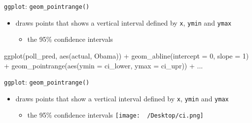 \documentclass[
  ignorenonframetext,
]{beamer}
\newenvironment{Shaded}{\begin{snugshade}}{\end{snugshade}}
\newcommand{\AttributeTok}[1]{\textcolor[rgb]{0.40,0.45,0.13}{#1}}
\newcommand{\DecValTok}[1]{\textcolor[rgb]{0.68,0.00,0.00}{#1}}
\newcommand{\FunctionTok}[1]{\textcolor[rgb]{0.28,0.35,0.67}{#1}}
\newcommand{\NormalTok}[1]{\textcolor[rgb]{0.00,0.23,0.31}{#1}}
\newcommand{\SpecialCharTok}[1]{\textcolor[rgb]{0.37,0.37,0.37}{#1}}
\providecommand{\tightlist}{%
  \setlength{\itemsep}{0pt}\setlength{\parskip}{0pt}}\usepackage{longtable,booktabs,array}
\begin{document}
\begin{frame}[fragile]{\texttt{ggplot}: \texttt{geom\_pointrange()}}
\protect\hypertarget{ggplot-geom_pointrange}{}
\begin{itemize}
\tightlist
\item
  draws points that shows a vertical interval defined by \texttt{x},
  \texttt{ymin} and \texttt{ymax}

  \begin{itemize}
  \tightlist
  \item
    the 95\% confidence intervals
  \end{itemize}
\end{itemize}

\begin{Shaded}
\begin{Highlighting}[]
\FunctionTok{ggplot}\NormalTok{(poll\_pred, }\FunctionTok{aes}\NormalTok{(actual, Obama)) }\SpecialCharTok{+}
  \FunctionTok{geom\_abline}\NormalTok{(}\AttributeTok{intercept =} \DecValTok{0}\NormalTok{,}
              \AttributeTok{slope =} \DecValTok{1}\NormalTok{) }\SpecialCharTok{+}
  \FunctionTok{geom\_pointrange}\NormalTok{(}\FunctionTok{aes}\NormalTok{(}\AttributeTok{ymin =}\NormalTok{ ci\_lower,}
                      \AttributeTok{ymax =}\NormalTok{ ci\_upr)) }\SpecialCharTok{+}
\NormalTok{  ...}
\end{Highlighting}
\end{Shaded}
\end{frame}

\begin{frame}[fragile]{\texttt{ggplot}: \texttt{geom\_pointrange()}}
\protect\hypertarget{ggplot-geom_pointrange-1}{}
\begin{itemize}
\tightlist
\item
  draws points that show a vertical interval defined by \texttt{x},
  \texttt{ymin} and \texttt{ymax}

  \begin{itemize}
  \tightlist
  \item
    the 95\% confidence intervals
    \texttt{[image: ~/Desktop/ci.png]}
  \end{itemize}
\end{itemize}
\end{frame}
\end{document}
